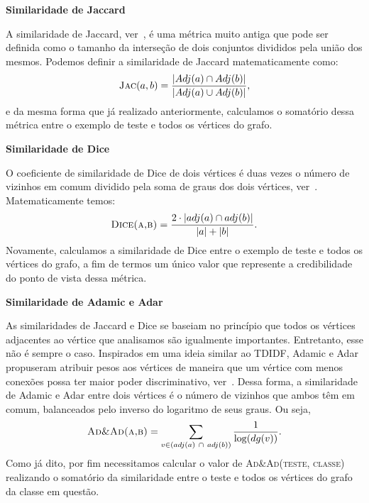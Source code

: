 \begin{description}
\item{\textbf{Similaridade de Jaccard}}
\label{item::jaccard}

A similaridade de Jaccard, ver~\cite{Jaccard01}, é uma métrica muito antiga que pode ser definida como o tamanho da interseção de dois conjuntos divididos pela união dos mesmos. Podemos definir a similaridade de Jaccard matematicamente como:
\begin{equation}
\textsc{Jac}(a, b) =  \frac{|Adj(a) \cap Adj(b)|}{|Adj(a) \cup Adj(b)|},
\end{equation}
e da mesma forma que já realizado anteriormente, calculamos o somatório dessa métrica entre o exemplo de teste e todos os vértices do grafo.


\item{\textbf{Similaridade de Dice}}
\label{item::dice}

O coeficiente de similaridade de Dice de dois vértices é duas vezes o número de vizinhos em comum dividido pela soma de graus dos dois vértices, ver~\cite{Dice45}. Matematicamente temos:
\begin{equation}
\textsc{Dice(a,b)} = \frac{2 \cdot | adj(a) \cap adj(b) | }{| a | + | b |}.
\end{equation}
Novamente, calculamos a similaridade de Dice entre o exemplo de teste e todos os vértices do grafo, a fim de termos um único valor que represente a credibilidade do ponto de vista dessa métrica.

\item{ \textbf{Similaridade de Adamic e Adar}}
\label{item::inverselog}

As similaridades de Jaccard e Dice se baseiam no princípio que todos os vértices adjacentes ao vértice que analisamos são igualmente importantes. Entretanto, esse não é sempre o caso.
Inspirados em uma ideia similar ao TDIDF, Adamic e Adar propuseram atribuir pesos aos vértices de maneira que um vértice com menos conexões possa ter maior poder discriminativo, ver~\cite{Adamic03}. Dessa forma, a similaridade de Adamic e Adar entre dois vértices é o número de vizinhos que ambos têm em comum, balanceados pelo inverso do logaritmo de seus graus. Ou seja,
\begin{equation}
\textsc{Ad\&Ad(a,b)} =  \sum\limits_{v \in (adj(a)\ \cap\ adj(b))} \frac{1}{ \log(dg(v))}.
\end{equation}
Como já dito, por fim necessitamos calcular o valor de \textsc{Ad\&Ad(teste, classe)} realizando o somatório da similaridade entre o teste e todos os vértices do grafo da classe em questão.

\end{description}



